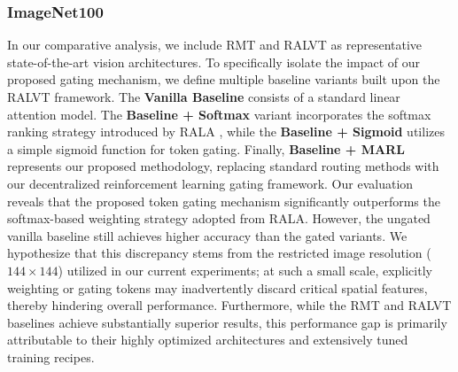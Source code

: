 \subsubsection{ImageNet100}
\begin{table}[htbp]
    \centering
    \vspace{0.5em}
    \caption{Comparison of models' accuracy on the ImageNet-100 dataset}
\end{table}
In our comparative analysis, we include RMT \cite{fan2024rmt} and RALVT \cite{fan2025breaking} as representative state-of-the-art vision architectures. To specifically isolate the impact of our proposed gating mechanism, we define multiple baseline variants built upon the RALVT framework. The \textbf{Vanilla Baseline} consists of a standard linear attention model. The \textbf{Baseline + Softmax} variant incorporates the softmax ranking strategy introduced by RALA \cite{fan2025breaking}, while the \textbf{Baseline + Sigmoid} utilizes a simple sigmoid function for token gating. Finally, \textbf{Baseline + MARL} represents our proposed methodology, replacing standard routing methods with our decentralized reinforcement learning gating framework. Our evaluation reveals that the proposed token gating mechanism significantly outperforms the softmax-based weighting strategy adopted from RALA. However, the ungated vanilla baseline still achieves higher accuracy than the gated variants. We hypothesize that this discrepancy stems from the restricted image resolution ($144 \times 144$) utilized in our current experiments; at such a small scale, explicitly weighting or gating tokens may inadvertently discard critical spatial features, thereby hindering overall performance. Furthermore, while the RMT and RALVT baselines achieve substantially superior results, this performance gap is primarily attributable to their highly optimized architectures and extensively tuned training recipes.
